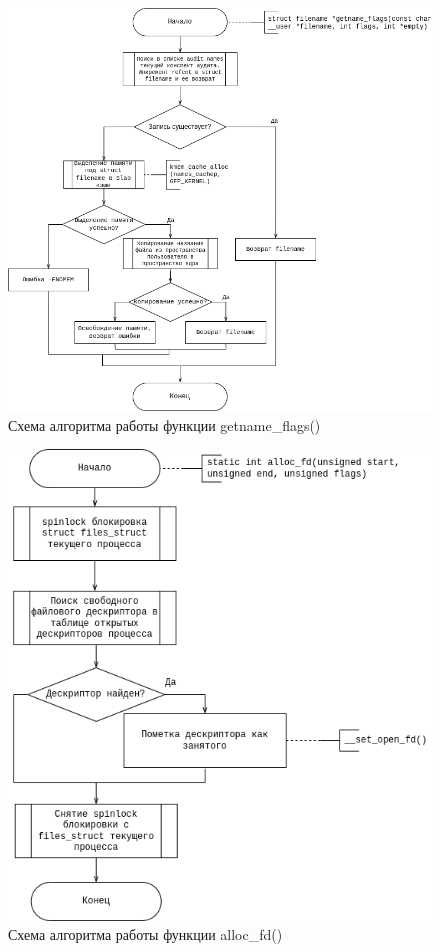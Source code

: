 \begin{figure}[H]
	\centering
	\includegraphics[scale=0.5]{assets/flowchart-getname.drawio.png}
	\caption{Схема алгоритма работы функции getname\_flags()}
\end{figure}

\begin{figure}[H]
	\centering
	\includegraphics[scale=0.47]{assets/flowchart-alloc_fd.drawio.png}
	\caption{Схема алгоритма работы функции alloc\_fd()}
\end{figure}


